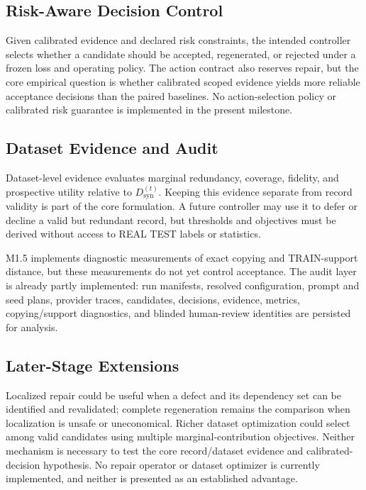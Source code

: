 \subsection{Risk-Aware Decision Control}

Given calibrated evidence and declared risk constraints, the intended
controller selects whether a candidate should be accepted, regenerated, or
rejected under a frozen loss and operating policy. The action contract also
reserves repair, but the core empirical question is whether calibrated scoped
evidence yields more reliable acceptance decisions than the paired baselines.
No action-selection policy or calibrated risk guarantee is implemented in the
present milestone.

\subsection{Dataset Evidence and Audit}

Dataset-level evidence evaluates marginal redundancy, coverage, fidelity, and
prospective utility relative to $D_{\mathrm{syn}}^{(t)}$. Keeping this evidence
separate from record validity is part of the core formulation. A future
controller may use it to defer or decline a valid but redundant record, but
thresholds and objectives must be derived without access to REAL TEST labels
or statistics.

M1.5 implements diagnostic measurements of exact copying and TRAIN-support
distance, but these measurements do not yet control acceptance. The audit
layer is already partly implemented: run manifests, resolved configuration,
prompt and seed plans, provider traces, candidates, decisions, evidence,
metrics, copying/support diagnostics, and blinded human-review identities are
persisted for analysis.

\subsection{Later-Stage Extensions}

Localized repair could be useful when a defect and its dependency set can be
identified and revalidated; complete regeneration remains the comparison when
localization is unsafe or uneconomical. Richer dataset optimization could
select among valid candidates using multiple marginal-contribution objectives.
Neither mechanism is necessary to test the core record/dataset evidence and
calibrated-decision hypothesis. No repair operator or dataset optimizer is
currently implemented, and neither is presented as an established advantage.

